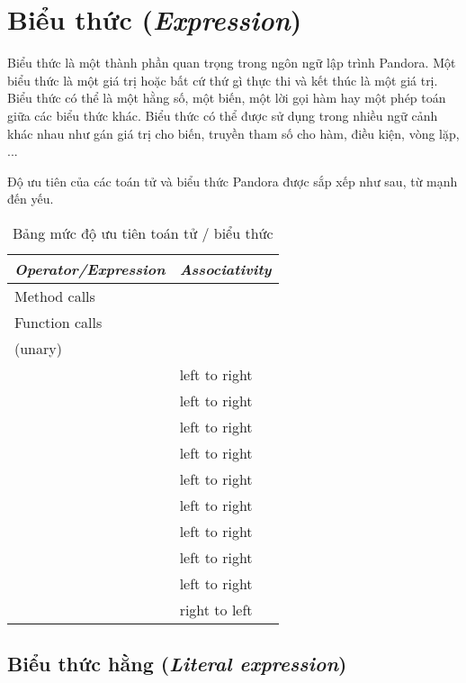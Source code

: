 \section{Biểu thức (\textit{Expression})}

\regexexpr

Biểu thức là một thành phần quan trọng trong ngôn ngữ lập trình Pandora. Một biểu thức là một giá trị hoặc bất cứ thứ gì thực thi và kết thúc là một giá trị. Biểu thức có thể là một hằng số, một biến, một lời gọi hàm hay một phép toán giữa các biểu thức khác. Biểu thức có thể được sử dụng trong nhiều ngữ cảnh khác nhau như gán giá trị cho biến, truyền tham số cho hàm, điều kiện, vòng lặp, ...

Độ ưu tiên của các toán tử và biểu thức Pandora được sắp xếp như sau, từ mạnh đến yếu. 

\begin{longtable}{| l | l |}
    \caption{Bảng mức độ ưu tiên toán tử / biểu thức} \\
\hline
\textbf{\textit{Operator/Expression}} & \textbf{\textit{Associativity}} \\
\hline
Method calls & \\
\hline
Function calls & \\
\hline
\w{$-$}(unary) \w{$*$} \w{$!$} & \\
\hline
\w{$*$} \w{$/$} \w{$\%$} & left to right \\
\hline
\w{$+$} \w{$-$} & left to right \\
\hline
\w{$<<$} \w{$>>$} & left to right \\
\hline
\w{$\&$} & left to right \\
\hline
\w{$\wedge$} & left to right \\
\hline
\w{$|$} & left to right \\
\hline
\w{$==$} \w{$!=$} \w{$<$} \w{$>$} \w{$<=$} \w{$>=$} & left to right \\
\hline
\w{$\&\&$} & left to right \\
\hline
\w{$||$} & left to right \\
\hline
\w{$=$} \w{$+=$} \w{$-=$} \w{$*=$} \w{$/=$} \w{$\%=$} \w{$<<=$} \w{$>>=$} \w{$\&=$} \w{$\wedge=$} \w{$|=$} & right to left \\
\hline
\end{longtable}

\subsection{Biểu thức hằng (\textit{Literal expression})}

